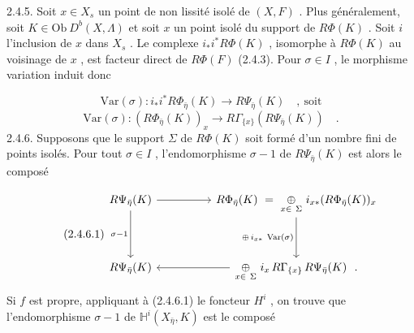 
2.4.5. Soit $x \in X_s$ un point de non lissité isolé de $(X, F)$ . Plus généralement, soit $K \in \mathrm{Ob}\ D^b(X, \Lambda)$ et soit $x$ un point isolé du support de $R\Phi(K)$ . Soit $i$ l'inclusion de $x$ dans $X_s$ . Le complexe $i_*i^* R\Phi(K)$ , isomorphe à $R\Phi(K)$ au voisinage de $x$ , est facteur direct de $R\Phi(F)$ (2.4.3). Pour $\sigma \in I$ , le morphisme variation induit donc

\begin{equation*}
\mathrm{Var}(\sigma) : i_*i^* R\Phi_{\bar\eta}(K) \longrightarrow R\Psi_{\bar\eta}(K) \quad , \ \text{soit}
\end{equation*}
\begin{equation}\tag{2.4.5.1}
\mathrm{Var}(\sigma) : (R\Phi_{\bar\eta}(K))_x \longrightarrow R\Gamma_{\{x\}}(R\Psi_{\bar\eta}(K)) \quad .
\end{equation}
2.4.6. Supposons que le support $\Sigma$ de $R\Phi(K)$ soit formé d'un nombre fini de points isolés. Pour tout $\sigma \in I$ , l'endomorphisme $\sigma - 1$ de $R\Psi_{\bar\eta}(K)$ est alors le composé

\begin{equation}\tag{2.4.6.1}
\begin{tikzcd}[column sep=huge, row sep=huge]
R\Psi_{\bar\eta}(K) \arrow[r] \arrow[d, "\sigma-1"'] & R\Phi_{\bar\eta}(K) \ =\ \underset{x\in\ \Sigma}{\oplus}\ i_{x*}(R\Phi_{\bar\eta}(K))_x \arrow[d, "{\oplus\, i_{x*}\ \mathrm{Var}(\sigma)}"'] \\
R\Psi_{\bar\eta}(K) & \underset{x\in\ \Sigma}{\oplus}\ i_x\, R\Gamma_{\{x\}}\, R\Psi_{\bar\eta}(K)\ \ . \arrow[l]
\end{tikzcd}
\end{equation}
Si $f$ est propre, appliquant à (2.4.6.1) le foncteur $H^i$ , on trouve que l'endomorphisme $\sigma-1$ de $\mathbb{H}^i(X_{\bar\eta}, K)$ est le composé

